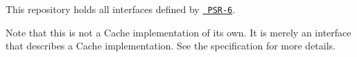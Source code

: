 This repository holds all interfaces defined by \href{http://www.php-fig.org/psr/psr-6/}{\texttt{ PSR-\/6}}.

Note that this is not a Cache implementation of its own. It is merely an interface that describes a Cache implementation. See the specification for more details. 